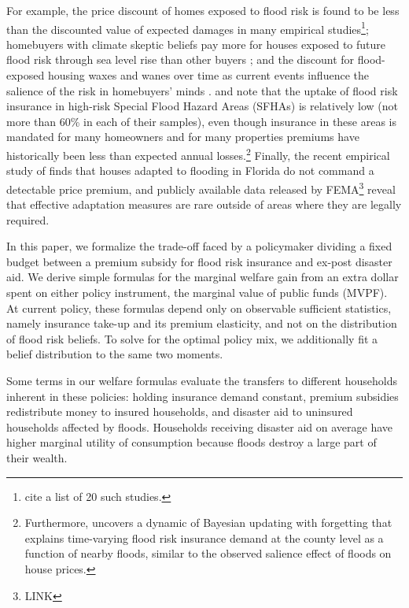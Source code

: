 \documentclass[12pt]{article}
\begin{document}
For example, the price discount of homes exposed to flood risk is found to be less than the discounted value of expected damages in many empirical studies\footnote{\cite{fairweather2024expecting} cite a list of 20 such studies.}; homebuyers with climate skeptic beliefs pay more for houses exposed to future flood risk through sea level rise than other buyers \citep{bernstein2019disaster,baldauf2020does,bakkensen2025leveraging}; and the discount for flood-exposed housing waxes and wanes over time as current events influence the salience of the risk in homebuyers' minds \citep{keys2020neglected,giglio2021rfs}. \cite{wagner2022adaptation} and \cite{amornsiripanitch2025measuring} note that the uptake of flood risk insurance in high-risk Special Flood Hazard Areas (SFHAs) is relatively low (not more than 60\% in each of their samples), even though insurance in these areas is mandated for many homeowners and for many properties premiums have historically been less than expected annual losses.\footnote{Furthermore, \cite{gallagher2014learning} uncovers a dynamic of Bayesian updating with forgetting that explains time-varying flood risk insurance demand at the county level as a function of nearby floods, similar to the observed salience effect of floods on house prices.} Finally, the recent empirical study of \cite{ostriker2022effects} finds that houses adapted to flooding in Florida do not command a detectable price premium, and publicly available data released by FEMA\footnote{LINK} reveal that effective adaptation measures are rare outside of areas where they are legally required.

In this paper, we formalize the trade-off faced by a policymaker dividing a fixed budget between a premium subsidy for flood risk insurance and ex-post disaster aid. We derive simple formulas for the marginal welfare gain from an extra dollar spent on either policy instrument, the marginal value of public funds (MVPF). At current policy, these formulas depend only on observable sufficient statistics, namely insurance take-up and its premium elasticity, and not on the distribution of flood risk beliefs. To solve for the optimal policy mix, we additionally fit a belief distribution to the same two moments.

Some terms in our welfare formulas evaluate the transfers to different households inherent in these policies: holding insurance demand constant,  premium subsidies redistribute money to insured households, and disaster aid to uninsured households affected by floods. Households receiving disaster aid on average have higher marginal utility of consumption because floods destroy a large part of their wealth.
\end{document}
